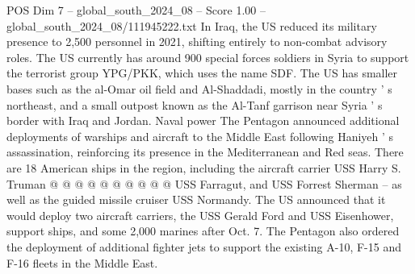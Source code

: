 \begin{textsample}{POS Dim 7 – global\_south\_2024\_08 – Score 1.00 – global\_south\_2024\_08/111945222.txt}
In Iraq, the US reduced its military presence to 2,500 personnel in 2021, shifting entirely to non-combat advisory roles.
The US currently has around 900 special forces soldiers in Syria to support the terrorist group YPG/PKK, which uses the name SDF.
The US has smaller bases such as the al-Omar oil field and Al-Shaddadi, mostly in the country ' s northeast, and a small outpost known as the Al-Tanf garrison near Syria ' s border with Iraq and Jordan.
Naval power The Pentagon announced additional deployments of warships and aircraft to the Middle East following Haniyeh ' s assassination, reinforcing its presence in the Mediterranean and Red seas.
There are 18 American ships in the region, including the aircraft carrier USS Harry S.
Truman @ @ @ @ @ @ @ @ @ @ USS Farragut, and USS Forrest Sherman -- as well as the guided missile cruiser USS Normandy.
The US announced that it would deploy two aircraft carriers, the USS Gerald Ford and USS Eisenhower, support ships, and some 2,000 marines after Oct. 7.
The Pentagon also ordered the deployment of additional fighter jets to support the existing A-10, F-15 and F-16 fleets in the Middle East.

\end{textsample}
